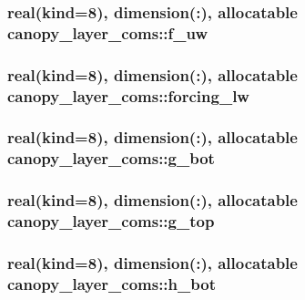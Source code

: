\subsubsection[{f\+\_\+uw}]{\setlength{\rightskip}{0pt plus 5cm}real(kind=8), dimension(\+:), allocatable canopy\+\_\+layer\+\_\+coms\+::f\+\_\+uw}\label{namespacecanopy__layer__coms_ac42fff0528a6772261cedc0d1ddf51ed}
\hypertarget{namespacecanopy__layer__coms_a456a3cd6ca31152aa6e000baf9ab668c}{}
\subsubsection[{forcing\+\_\+lw}]{\setlength{\rightskip}{0pt plus 5cm}real(kind=8), dimension(\+:), allocatable canopy\+\_\+layer\+\_\+coms\+::forcing\+\_\+lw}\label{namespacecanopy__layer__coms_a456a3cd6ca31152aa6e000baf9ab668c}
\hypertarget{namespacecanopy__layer__coms_a29c0519f56906b6f06da139fc1ba16ec}{}
\subsubsection[{g\+\_\+bot}]{\setlength{\rightskip}{0pt plus 5cm}real(kind=8), dimension(\+:), allocatable canopy\+\_\+layer\+\_\+coms\+::g\+\_\+bot}\label{namespacecanopy__layer__coms_a29c0519f56906b6f06da139fc1ba16ec}
\hypertarget{namespacecanopy__layer__coms_aa7fbffea9917d60f4c6ca5262222c69a}{}
\subsubsection[{g\+\_\+top}]{\setlength{\rightskip}{0pt plus 5cm}real(kind=8), dimension(\+:), allocatable canopy\+\_\+layer\+\_\+coms\+::g\+\_\+top}\label{namespacecanopy__layer__coms_aa7fbffea9917d60f4c6ca5262222c69a}
\hypertarget{namespacecanopy__layer__coms_a0d074763380f49037306d0846a05a072}{}
\subsubsection[{h\+\_\+bot}]{\setlength{\rightskip}{0pt plus 5cm}real(kind=8), dimension(\+:), allocatable canopy\+\_\+layer\+\_\+coms\+::h\+\_\+bot}\label{namespacecanopy__layer__coms_a0d074763380f49037306d0846a05a072}
\hypertarget{namespacecanopy__layer__coms_a16fa644c3a2ec33a530019e5b5caf16c}{}
